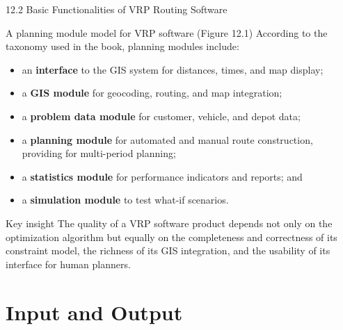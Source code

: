 \documentclass[aspectratio=169,10pt]{beamer}
\begin{document}
\begin{frame}[allowframebreaks]{12.2 \; Basic Functionalities of VRP Routing Software}
  \begin{block}{A planning module model for VRP software (Figure 12.1)}
    According to the taxonomy used in the book, planning modules include:
    \begin{itemize}
      \item an \textbf{interface} to the GIS system for distances, times,
            and map display;
      \item a \textbf{GIS module} for geocoding, routing, and map integration;
      \item a \textbf{problem data module} for customer, vehicle, and depot data;
      \item a \textbf{planning module} for automated and manual route construction,
            providing for multi-period planning;
      \item a \textbf{statistics module} for performance indicators and reports; and
      \item a \textbf{simulation module} to test what-if scenarios.
    \end{itemize}
  \end{block}

  \begin{alertblock}{Key insight}
    The quality of a VRP software product depends not only on the optimization
    algorithm but equally on the completeness and correctness of its constraint
    model, the richness of its GIS integration, and the usability of its
    interface for human planners.
  \end{alertblock}
\end{frame}

\section{Input and Output}
\end{document}
